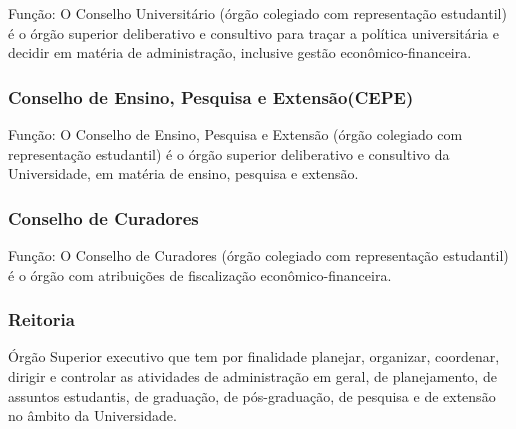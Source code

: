 \documentclass{report}
\begin{document}
Função: O Conselho Universitário (órgão colegiado com representação estudantil) é o órgão superior deliberativo e consultivo para traçar a política universitária e decidir em matéria de administração, inclusive gestão econômico-financeira.


\subsubsection{Conselho de Ensino, Pesquisa e Extensão(CEPE)}

Função: O Conselho de Ensino, Pesquisa e Extensão (órgão colegiado com representação estudantil) é o órgão superior deliberativo e consultivo da Universidade, em matéria de ensino, pesquisa e extensão.

\subsubsection{Conselho de Curadores}

Função: O Conselho de Curadores (órgão colegiado com representação estudantil) é o órgão com atribuições de fiscalização econômico-financeira.

\subsubsection{Reitoria}

Órgão Superior executivo que tem por finalidade planejar, organizar, coordenar, dirigir e controlar as atividades de administração em geral, de planejamento, de assuntos estudantis, de graduação, de pós-graduação, de pesquisa e de extensão no âmbito da Universidade.
\end{document}
